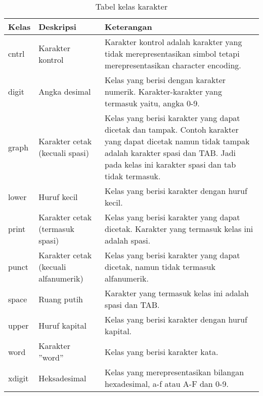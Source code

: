 \begin{table}[H]
	\renewcommand{\arraystretch}{1.5}
	\caption {Tabel kelas karakter} \label{tab:character classes}
	\begin{center}
		\begin{tabular}{|p{2 cm}|>{\raggedright} p{5 cm}| p{7.5 cm}|}
		\hline
		Kelas & Deskripsi & Keterangan \\ 
		\hline 
		cntrl & Karakter kontrol & Karakter kontrol adalah karakter yang tidak merepresentasikan simbol tetapi merepresentasikan character encoding. \newline \\ 		
		\hline 
		digit & Angka desimal & Kelas yang berisi dengan karakter numerik. Karakter-karakter yang termasuk yaitu, angka 0-9. \newline \\ 		
		\hline 
		graph & Karakter cetak (kecuali spasi) & Kelas yang berisi karakter yang dapat dicetak dan tampak. Contoh karakter yang dapat dicetak namun tidak tampak adalah karakter spasi dan TAB. Jadi pada kelas ini karakter spasi dan tab tidak termasuk. \newline \\ 
		\hline 
		lower & Huruf kecil & Kelas yang berisi karakter dengan huruf kecil. \newline \\ 
		\hline 
		print & Karakter cetak (termasuk spasi) & Kelas yang berisi karakter yang dapat dicetak. Karakter yang termasuk kelas ini adalah spasi. \newline \\ 
		\hline 
		punct & Karakter cetak (kecuali alfanumerik) & Kelas yang berisi karakter yang dapat dicetak, namun tidak termasuk alfanumerik. \newline \\ 
		\hline 
		space & Ruang putih & Karakter yang termasuk kelas ini adalah spasi dan TAB. \newline \\ 
		\hline 
		upper & Huruf kapital & Kelas yang berisi karakter dengan huruf kapital. \newline \\ 
		\hline 
		word & Karakter ''word'' & Kelas yang berisi karakter kata. \newline \\ 
		\hline 
		xdigit & Heksadesimal & Kelas yang merepresentasikan bilangan hexadesimal, a-f atau A-F dan 0-9. \newline \\ 
		\hline 
		\end{tabular} 
	\end{center}
\end{table}

